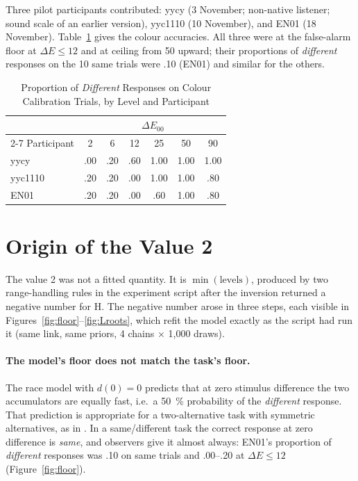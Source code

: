 \documentclass[man,12pt,floatsintext,natbib]{apa7}
\begin{document}
Three pilot participants contributed: yycy (3 November; non-native listener; sound scale of an earlier version), yyc1110 (10 November), and EN01 (18 November). Table~\ref{tab:colour} gives the colour accuracies. All three were at the false-alarm floor at $\Delta E \le 12$ and at ceiling from 50 upward; their proportions of \emph{different} responses on the 10 same trials were .10 (EN01) and similar for the others.

\begin{table}[htbp]
\caption{Proportion of \emph{Different} Responses on Colour Calibration Trials, by Level and Participant}
\label{tab:colour}
\begin{tabular}{lcccccc}
\toprule
 & \multicolumn{6}{c}{$\Delta E_{00}$} \\
\cmidrule(lr){2-7}
Participant & 2 & 6 & 12 & 25 & 50 & 90 \\
\midrule
yycy    & .00 & .20 & .60 & 1.00 & 1.00 & 1.00 \\
yyc1110 & .20 & .20 & .00 & 1.00 & 1.00 & .80 \\
EN01    & .20 & .20 & .00 & .60  & 1.00 & .80 \\
\bottomrule
\end{tabular}
\end{table}

\section{Origin of the Value 2}\label{sec:mechanism}

The value 2 was not a fitted quantity. It is $\min(\text{levels})$, produced by two range-handling rules in the experiment script after the inversion returned a negative number for H. The negative number arose in three steps, each visible in Figures~\ref{fig:floor}--\ref{fig:Lroots}, which refit the model exactly as the script had run it (same link, same priors, 4 chains $\times$ 1{,}000 draws).

\paragraph{The model's floor does not match the task's floor.} The race model with $d(0) = 0$ predicts that at zero stimulus difference the two accumulators are equally fast, i.e.\ a \SI{50}{\percent} probability of the \emph{different} response. That prediction is appropriate for a two-alternative task with symmetric alternatives, as in \citet{houpt2014}. In a same/different task the correct response at zero difference is \emph{same}, and observers give it almost always: EN01's proportion of \emph{different} responses was .10 on same trials and .00--.20 at $\Delta E \le 12$ (Figure~\ref{fig:floor}).
\end{document}

